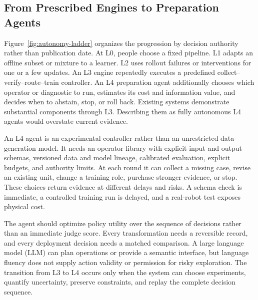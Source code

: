 \subsection{From Prescribed Engines to Preparation Agents}

Figure~\ref{fig:autonomy-ladder} organizes the progression by decision authority rather than publication date. At L0, people choose a fixed pipeline. L1 adapts an offline subset or mixture to a learner. L2 uses rollout failures or interventions for one or a few updates. An L3 engine repeatedly executes a predefined collect--verify--route--train controller. An L4 preparation agent additionally chooses which operator or diagnostic to run, estimates its cost and information value, and decides when to abstain, stop, or roll back. Existing systems demonstrate substantial components through L3. Describing them as fully autonomous L4 agents would overstate current evidence.



An L4 agent is an experimental controller rather than an unrestricted data-generation model. It needs an operator library with explicit input and output schemas, versioned data and model lineage, calibrated evaluation, explicit budgets, and authority limits. At each round it can collect a missing case, revise an existing unit, change a training role, purchase stronger evidence, or stop. These choices return evidence at different delays and risks. A schema check is immediate, a controlled training run is delayed, and a real-robot test exposes physical cost.

The agent should optimize policy utility over the sequence of decisions rather than an immediate judge score. Every transformation needs a reversible record, and every deployment decision needs a matched comparison. A large language model (LLM) can plan operations or provide a semantic interface, but language fluency does not supply action validity or permission for risky exploration. The transition from L3 to L4 occurs only when the system can choose experiments, quantify uncertainty, preserve constraints, and replay the complete decision sequence.
